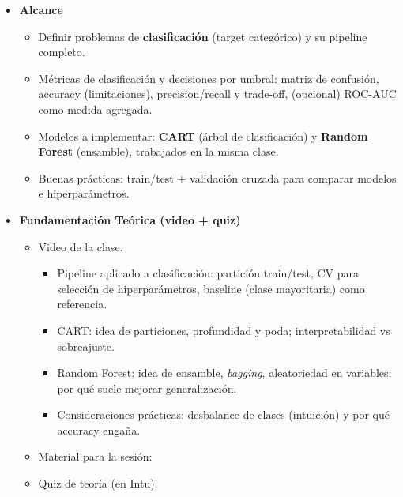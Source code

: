 \documentclass{article}
\begin{document}
\begin{itemize}
\item \textbf{Alcance}
\begin{itemize}
  \item Definir problemas de \textbf{clasificación} (target categórico) y su pipeline completo.
  \item Métricas de clasificación y decisiones por umbral: matriz de confusión, accuracy (limitaciones), precision/recall y trade-off, (opcional) ROC-AUC como medida agregada.
  \item Modelos a implementar: \textbf{CART} (árbol de clasificación) y \textbf{Random Forest} (ensamble), trabajados en la misma clase.
  \item Buenas prácticas: train/test + validación cruzada para comparar modelos e hiperparámetros.
\end{itemize}

\item \textbf{Fundamentación Teórica (video + quiz)}
\begin{itemize}
  \item Video de la clase. %
  \begin{itemize}
    \item Pipeline aplicado a clasificación: partición train/test, CV para selección de hiperparámetros, baseline (clase mayoritaria) como referencia.
    \item CART: idea de particiones, profundidad y poda; interpretabilidad vs sobreajuste.
    \item Random Forest: idea de ensamble, \textit{bagging}, aleatoriedad en variables; por qué suele mejorar generalización.
    \item Consideraciones prácticas: desbalance de clases (intuición) y por qué accuracy engaña.
  \end{itemize}
  \item Material para la sesión: %
  \item Quiz de teoría (en Intu).
\end{itemize}


\end{itemize}
\end{document}
